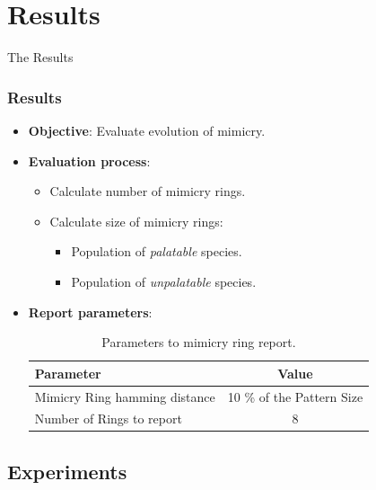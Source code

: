 \section{Results}

\frame
{
	\begin{center}
		\LARGE The Results
	\end{center}
}

\frame
{
	\frametitle{Results}

	\begin{itemize}
	  \item \textbf{Objective}: Evaluate evolution of mimicry.
	  \item \textbf{Evaluation process}:
			\begin{itemize}
			  \item Calculate number of mimicry rings.
			  \item Calculate size of mimicry rings:
					\begin{itemize}
					  \item Population of \textit{palatable} species.
					  \item Population of \textit{unpalatable} species.
					\end{itemize}			  
			\end{itemize}
		\item \textbf{Report parameters}:
			\begin{table}
			\centering
			\begin{scriptsize}
			\begin{spacing}{1.5}
			\begin{tabular}{| l | c |}
				\hline
					\textbf{Parameter} & \textbf{Value} \\ \hline
					Mimicry Ring hamming distance & 10 \% of the Pattern Size \\ \hline
					Number of Rings to report & 8 \\
				\hline
			\end{tabular}
			\end{spacing}
			\end{scriptsize}
			\caption{Parameters to mimicry ring report.}
			\label{tab:ring-report-control-parameters}
			\end{table}		
	\end{itemize}
}

\subsection{Experiments}

